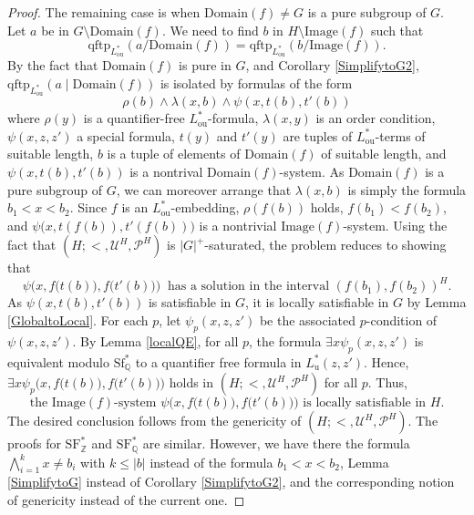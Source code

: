 \documentclass[letterpaper]{amsart}
\newcommand{\qq}{\mathbb{Q}}
\newcommand{\zz}{\mathbb{Z}}
\newcommand{\sU}{\mathscr{U}}
\newcommand{\sP}{\mathscr{P}}
\newcommand{\TSFZ}{\mathrm{SF}^*_{\zz}}
\newcommand{\TSFQ}{\mathrm{SF}^*_{\qq}}
\newcommand{\WSFQ}{\mathrm{Sf}^*_{\qq}}
\begin{document}
\begin{proof}
The remaining case is when $\text{Domain}(f) \neq G$ is a pure subgroup of $G$. Let $a$ be in $G \setminus \text{Domain}(f)$. We need to find $b$ in $H \setminus\text{Image}(f)$ such that $$\text{qftp}_{L_{\mathrm{ou}}^*}(a \slash \text{Domain}(f)) = \text{qftp}_{L_{\mathrm{ou}}^*}(b \slash \text{Image}(f)). $$ By the fact that $\text{Domain}(f)$ is pure in $G$, and Corollary \ref{SimplifytoG2}, $\text{qftp}_{L_{\mathrm{ou}}^*}(a \mid \text{Domain}(f))$ is isolated by formulas of the form
$$ \rho(b) \wedge \lambda(x,b) \wedge \psi(x, t(b), t'(b)) $$
where $\rho(y)$ is a quantifier-free $L^*_{\mathrm{ou}}$-formula, $\lambda(x,y)$ is an order condition,  $\psi(x, z, z')$ a special formula, $t(y)$ and $t'(y)$ are tuples of $L_{\mathrm{ou}}^*$-terms of suitable length,  $b$ is a tuple of elements of $\text{Domain}(f)$ of suitable length, and $\psi(x, t(b), t'(b))$ is a nontrival $\text{Domain}(f)$-system. As $\text{Domain}(f)$ is a pure subgroup of $G$, we can moreover arrange that $\lambda(x,b)$ is simply the formula $b_1 < x <b_2$. Since $f$ is an $L_{\mathrm{ou}}^*$-embedding, $\rho(f(b))$ holds,  $f(b_1) < f(b_2)$, and $\psi\big(x, t(f(b)), t'(f(b))\big) $ is a nontrivial $\text{Image}(f)$-system. Using the fact that $(H; <, \sU^H , \sP^H )$ is $|G|^+$-saturated, the problem reduces to showing that 
$$\psi\Big(x, f\big(t(b)\big), f\big(t'(b)\big)\Big) \ \text{ has a solution in the interval } (f(b_1), f(b_2))^H.$$ As $\psi(x, t(b), t'(b))$ is satisfiable in $G$, it is locally satisfiable in $G$ by Lemma \ref{GlobaltoLocal}. For each $p$, let $\psi_p(x, z, z')$ be the  associated $p$-condition of $\psi(x, z, z')$. By Lemma \ref{localQE}, for all $p$, the formula $\exists x \psi_p(x, z, z')$ is equivalent modulo $\WSFQ$ to a quantifier free formula in $L^*_{\mathrm{u}}(z, z')$. Hence, $\exists x \psi_p\Big(x, f\big(t(b)\big), f\big(t'(b)\big)\Big)$ holds in $(H;<, \sU^H, \sP^H)$ for all $p$. Thus, $$\text{the } \text{Image}(f)\text{-system }\psi\Big(x, f\big(t(b)\big), f\big(t'(b)\big)\Big)  \text{ is locally satisfiable in } H.$$ The desired conclusion follows from the genericity of $(H; <, \sU^H, \sP^H)$.  The proofs for $\TSFZ$ and $\TSFQ$ are similar. However,  we have there the formula  $\bigwedge_{i =1}^k x \neq b_i$ with $k \leq |b|$ instead of the formula $b_1< x< b_2$, Lemma \ref{SimplifytoG} instead of Corollary \ref{SimplifytoG2}, and the corresponding notion of genericity instead of the current one. 
\end{proof}
\end{document}
